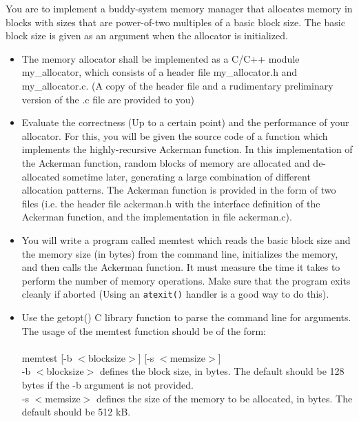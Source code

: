 \documentclass[12pt]{extarticle}
\newenvironment{myindentpar}[1]%
 {\begin{list}{}%
         {\setlength{\leftmargin}{#1}}%
         \item[]%
 }
 {\end{list}}
\newcommand{\code}[1]{\colorbox{codegray}{\texttt{#1}}}
\begin{document}
\begin{myindentpar}{6.5mm}

    \noindent
    You are to implement a buddy-system memory manager that allocates memory in blocks with sizes that are power-of-two multiples of a basic block size.  The basic block size is given as an argument when the allocator is initialized.  
    
    \begin{itemize}
    
        \item The memory allocator shall be implemented as a C/C++ module my\_allocator, which consists of a header file my\_allocator.h and my\_allocator.c. (A copy of the header file and a rudimentary preliminary version of the .c file are provided to you)
        \item Evaluate the correctness (Up to a certain point) and the performance of your allocator.  For this, you will be given the source code of a function which implements the highly-recursive Ackerman function.  In this implementation of the Ackerman function, random blocks of memory are allocated and de-allocated sometime later, generating a large combination of different allocation patterns.  The Ackerman function is provided in the form of two files (i.e. the header file ackerman.h with the interface definition of the Ackerman function, and the implementation in file ackerman.c).  
        \item You will write a program called memtest which reads the basic block size and the memory size (in bytes) from the command line, initializes the memory, and then calls the Ackerman function.  It must measure the time it takes to perform the number of memory operations.  Make sure that the program exits cleanly if aborted (Using an \code{atexit()} handler is a good way to do this).
        \item Use the getopt() C library function to parse the command line for arguments.  The usage of the memtest function should be of the form: \\
        \ \\
        memtest [-b $<$blocksize$>$] [-s $<$memsize$>$] \\
        -b $<$blocksize$>$ defines the block size, in bytes.  The default should be 128 bytes if the -b argument is not provided.  \\
        -s $<$memsize$>$ defines the size of the memory to be allocated, in bytes.  The default should be 512 kB.  \\
        \ \\

\end{itemize}
\end{myindentpar}
\end{document}
